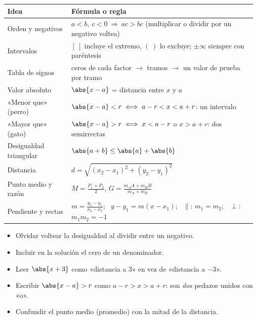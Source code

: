 \documentclass[11pt,a4paper]{article}
\begin{document}
\repaso
\begin{center}
\begin{tabularx}{\linewidth}{@{}l L@{}}
\toprule
Idea & Fórmula o regla\\ \midrule
Orden y negativos & $a<b,\ c<0\ \Rightarrow\ ac>bc$ (multiplicar o dividir por un negativo voltea)\\
Intervalos & $[\ ]$ incluye el extremo, $(\ )$ lo excluye; $\pm\infty$ siempre con paréntesis\\
Tabla de signos & ceros de cada factor $\to$ tramos $\to$ un valor de prueba por tramo\\
Valor absoluto & $\abs{x-a}$ = distancia entre $x$ y $a$\\
«Menor que» (perro) & $\abs{x-a}<r\iff a-r<x<a+r$: un intervalo\\
«Mayor que» (gato) & $\abs{x-a}>r\iff x<a-r$ o $x>a+r$: dos semirrectas\\
Desigualdad triangular & $\abs{a+b}\le\abs{a}+\abs{b}$\\
Distancia & $d=\sqrt{(x_2-x_1)^2+(y_2-y_1)^2}$\\
Punto medio y razón & $M=\frac{P_1+P_2}{2}$, \quad $G=\frac{m_AA+m_BB}{m_A+m_B}$\\
Pendiente y rectas & $m=\frac{y_2-y_1}{x_2-x_1}$; \ $y-y_1=m(x-x_1)$; \ $\parallel$: $m_1=m_2$; \ $\perp$: $m_1m_2=-1$\\
\bottomrule
\end{tabularx}
\end{center}

\begin{ojo}
\begin{itemize}
\item Olvidar voltear la desigualdad al dividir entre un negativo.
\item Incluir en la solución el cero de un denominador.
\item Leer $\abs{x+3}$ como «distancia a $3$» en vez de «distancia a $-3$».
\item Escribir $\abs{x-a}>r$ como $a-r>x>a+r$: son \emph{dos} pedazos unidos con «o».
\item Confundir el punto medio (promedio) con la mitad de la distancia.
\end{itemize}
\end{ojo}
\end{document}
